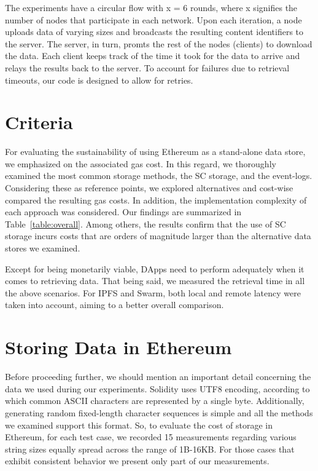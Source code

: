 The experiments have a circular flow with x = 6 rounds, where x signifies the number of nodes that participate in each network. Upon each iteration, a node uploads data of varying sizes and broadcasts the resulting content identifiers to the server. The server, in turn, promts the rest of the nodes (clients) to download the data. Each client keeps track of the time it took for the data to arrive and relays the results back to the server. To account for failures due to retrieval timeouts, our code is designed to allow for retries. 
\section{Criteria}\label{sec:}
For evaluating the sustainability of using Ethereum as a stand-alone data store, we emphasized on the associated gas cost. In this regard, we thoroughly examined the most common storage methods, the SC storage, and the event-logs. Considering these as reference points, we explored alternatives and cost-wise compared the resulting gas costs. In addition, the implementation complexity of each approach was considered. Our findings are summarized in Table~\ref{table:overall}. Among others, the results confirm that the use of SC storage incurs costs that are orders of magnitude larger than the alternative data stores we examined.

Except for being monetarily viable, DApps need to perform adequately when it comes to retrieving data. That being said, we measured the retrieval time in all the above scenarios. For IPFS and Swarm, both local and remote latency were taken into account, aiming to a better overall comparison.
\section{Storing Data in Ethereum}\label{sec:evaluation_ethereum}
Before proceeding further, we should mention an important detail concerning the data we used during our experiments. Solidity uses UTF8 encoding, according to which common ASCII characters are represented by a single byte. Additionally, generating random fixed-length character sequences is simple and all the methods we examined support this format. So, to evaluate the cost of storage in Ethereum, for each test case, we recorded 15 measurements regarding various string sizes equally spread across the range of 1B-16KB. For those cases that exhibit consistent behavior we present only part of our measurements.

